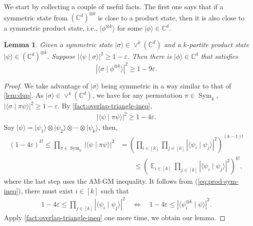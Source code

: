 \documentclass[10pt,a4paper]{article}
\newtheorem{lemma}[theorem]{Lemma}
\theoremstyle{remark}
\def\epsilon{\varepsilon}
\newcommand{\C}{{\mathbb C}}
\newcommand{\1}[1]{\mathds{1}{[#1]}}
\newcommand{\ket}[1]{\lvert #1\rangle}
\DeclareMathOperator{\Sym}{Sym}
\newcommand{\Symm}[2]{\vee^{#1}(\C^{#2})}
\DeclareMathOperator*{\Exp}{\mathbb{E}}
\numberwithin{equation}{section}
\begin{document}
We start by collecting a couple of useful facts. The first one says that if a symmetric state from $(\C^d)^{\otimes k}$ is close to a product state, then it is also close to a symmetric product state, i.e., $\ket{\phi^{\otimes k}}$ for some $\ket\phi \in \C ^d$.
\begin{lemma} \label{lem:prod-symmetric-state}
Given a symmetric state $\ket\sigma\in\Symm{k}{d}$ and a $k$-partite product state $\ket\psi\in (\C^d)^{\otimes k}$. Suppose $|\langle \psi \mid \sigma \rangle|^2 \ge 1-\epsilon$. Then there is $\ket\phi\in\C^d$ that satisfies
\[
    |\langle\sigma\mid \phi^{\otimes k}\rangle|^2 \ge 
    1-9\epsilon.
\]
\end{lemma}
\begin{proof}
We take advantage of $\ket\sigma$ being symmetric in a way similar to that of \cref{lem:dup}. As $\ket\sigma\in\Symm{k}{d}$, we have for any permutation $\pi\in \Sym_k$, $|\langle \sigma \mid \pi\psi\rangle|^2\ge1-\epsilon$. By \cref{fact:overlap-triangle-ineq},
\begin{align*}
    |\langle \psi \mid \pi\psi \rangle|^2 \ge 1-4\epsilon.
\end{align*}
Say $\ket\psi=\ket{\psi_1}\otimes\ket{\psi_2}\otimes \cdots \otimes\ket{\psi_k}$, then,
\begin{align}
    (1-4\epsilon)^{k!} 
    \le \prod_{\pi\in \Sym_k} |\langle \psi \mid \pi\psi \rangle|^2    
    &=\left(\prod_{i\in[k]}\prod_{j \in [k]} |\langle \psi_i\mid \psi_j\rangle|^2\right)^{(k-1)!}
        \nonumber\\
    &\qquad\le \left(\Exp_{i\in[k]} \prod_{j\in[k]}
    |\langle \psi_i\mid \psi_j\rangle|^2\right)^{k!},
        \label{eq:prod-sym-ineq}
\end{align}
where the last step uses the AM-GM inequality. It follows from (\ref{eq:prod-sym-ineq}), there must exist $i\in[k]$ such that
\begin{align}
     1-4\epsilon\le \prod_{j\in [k]} |\langle \psi_i \mid \psi_j \rangle|^2 
         \quad \iff \quad
     1-4\epsilon \le |\langle  \psi_i ^{\otimes k} \mid \psi \rangle|^2.
     \nonumber
\end{align}
Apply \cref{fact:overlap-triangle-ineq} one more time, we obtain our lemma.
\end{proof}
\end{document}
